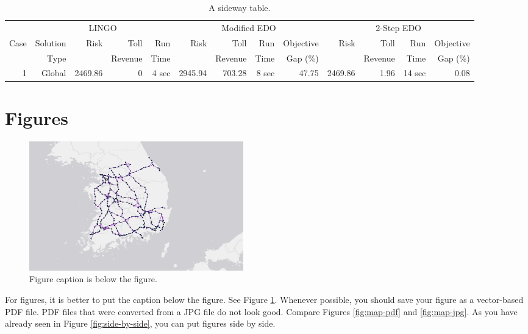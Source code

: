 \documentclass[letterpaper, 11pt]{article}
\begin{document}
\begin{table}
\caption{A sideway table.}
\label{table:EDOandLINGO}
\begin{tabular}{r rrrr rrrr rrrr}
\toprule
& \multicolumn{4}{c}{LINGO} & \multicolumn{4}{c}{Modified EDO} & \multicolumn{4}{c}{2-Step EDO} \\
\cmidrule(lr){2-5} \cmidrule(lr){6-9} \cmidrule(lr){10-12} 
Case &     Solution &    Risk &     Toll &   Run   &    Risk &    Toll &   Run & Objective   &    Risk &    Toll &    Run & Objective \\
     &         Type &         &  Revenue &  Time   &         & Revenue &  Time &  Gap (\%)   &         & Revenue &   Time &  Gap (\%) \\
\midrule
   1 &       Global & 2469.86 &        0 & 4 sec   & 2945.94 &  703.28 & 8 sec &     47.75   & 2469.86 &    1.96 & 14 sec &      0.08 \\
\bottomrule
\end{tabular}
\end{table}

















\section{Figures} \label{sec:figures}


\begin{figure} \centering
\includegraphics[width=0.45\textwidth]{map}
\caption{Figure caption is below the figure.}
\label{fig:map}
\end{figure}

For figures, it is better to put the caption below the figure. See Figure \ref{fig:map}. Whenever possible, you should save your figure as a vector-based PDF file. PDF files that were converted from a JPG file do not look good. Compare Figures \ref{fig:map-pdf} and \ref{fig:map-jpg}. As you have already seen in Figure \ref{fig:side-by-side}, you can put figures side by side.
\end{document}
